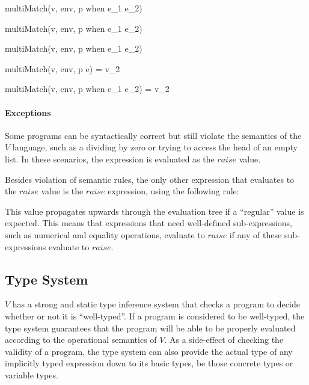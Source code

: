 \documentclass{article}
\begin{document}
  {\neg \; multiMatch(v, \mbox{env}, p \; \mbox{when} \; e_1 \rightarrow e_2)}

  {\neg \; multiMatch(v, \mbox{env}, p \; \mbox{when} \; e_1 \rightarrow e_2)}

  {\neg \; multiMatch(v, \mbox{env}, p \; \mbox{when} \; e_1 \rightarrow e_2)}

  {multiMatch(v, \mbox{env}, p \rightarrow e) = v_2}

  {multiMatch(v, \mbox{env}, p \; \mbox{when} \; e_1 \rightarrow e_2) = v_2}

\paragraph{Exceptions}

Some programs can be syntactically correct but still violate the semantics of the $V$ language, such as a dividing by zero or trying to access the head of an empty list.
In these scenarios, the expression is evaluated as the $raise$ value.

Besides violation of semantic rules, the only other expression that evaluates to the $raise$ value is the $raise$ expression, using the following rule:


This value propagates upwards through the evaluation tree if a ``regular'' value is expected.
This means that expressions that need well-defined sub-expressions, such as numerical and equality operations, evaluate to $raise$ if any of these sub-expressions evaluate to $raise$.

\subsection{Type System}\label{Type System}

$V$ has a strong and static type inference system that checks a program to decide whether or not it is "`well-typed"'.
If a program is considered to be well-typed, the type system guarantees that the program will be able to be properly evaluated according to the operational semantics of $V$.
As a side-effect of checking the validity of a program, the type system can also provide the actual type of any implicitly typed expression down to its basic types, be those concrete types or variable types.
\end{document}
